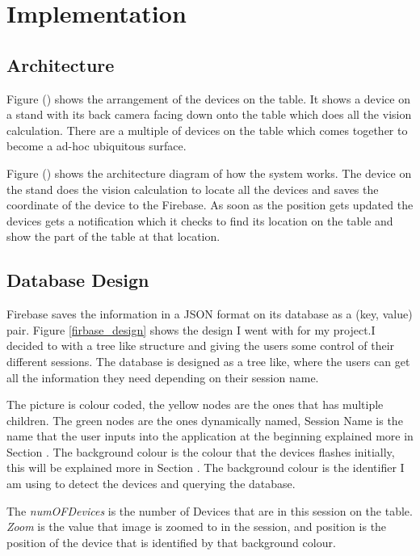 \section{Implementation}
\subsection{Architecture}

Figure () shows the arrangement of the devices on the table. It shows a device on a stand with its back camera facing down onto the table which does all the vision calculation. There are a multiple of devices on the table which comes together to become a ad-hoc ubiquitous surface.

Figure () shows the architecture diagram of how the system works. The device on the stand does the vision calculation to locate all the devices and saves the coordinate of the device to the Firebase. As soon as the position gets updated the devices gets a notification which it checks to find its location on the table and show the part of the table at that location.

\subsection{Database Design}

Firebase saves the information in a JSON format on its database as a (key, value) pair. Figure \ref{firbase_design} shows the design I went with for my project.I decided to with a tree like structure and giving the users some control of their different sessions. The database is designed as a tree like, where the users can get all the information they need depending on their session name. 

The picture is colour coded, the yellow nodes are the ones that has multiple children. The green nodes are the ones dynamically named, Session Name is the name that the user inputs into the application at the beginning explained more in Section . The background colour is the colour that the devices flashes initially, this will be explained more in Section . The background colour is the identifier I am using to detect the devices and querying the database. 

The \emph{numOFDevices} is the number of Devices that are in this session on the table. \emph{Zoom} is the value that image is zoomed to in the session, and position is the position of the device that is identified by that background colour.

